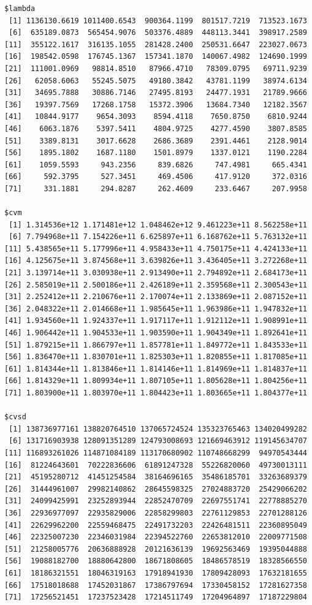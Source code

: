 \documentclass[
]{article}
\begin{document}
\begin{verbatim}
$lambda
 [1] 1136130.6619 1011400.6543  900364.1199  801517.7219  713523.1673
 [6]  635189.0873  565454.9076  503376.4889  448113.3441  398917.2589
[11]  355122.1617  316135.1055  281428.2400  250531.6647  223027.0673
[16]  198542.0598  176745.1367  157341.1870  140067.4982  124690.1999
[21]  111001.0969   98814.8510   87966.4710   78309.0795   69711.9239
[26]   62058.6063   55245.5075   49180.3842   43781.1199   38974.6134
[31]   34695.7888   30886.7146   27495.8193   24477.1931   21789.9666
[36]   19397.7569   17268.1758   15372.3906   13684.7340   12182.3567
[41]   10844.9177    9654.3093    8594.4118    7650.8750    6810.9244
[46]    6063.1876    5397.5411    4804.9725    4277.4590    3807.8585
[51]    3389.8131    3017.6628    2686.3689    2391.4461    2128.9014
[56]    1895.1802    1687.1180    1501.8979    1337.0121    1190.2284
[61]    1059.5593     943.2356     839.6826     747.4981     665.4341
[66]     592.3795     527.3451     469.4506     417.9120     372.0316
[71]     331.1881     294.8287     262.4609     233.6467     207.9958

$cvm
 [1] 1.314536e+12 1.171481e+12 1.048462e+12 9.461223e+11 8.562258e+11
 [6] 7.794968e+11 7.154226e+11 6.625897e+11 6.168762e+11 5.763132e+11
[11] 5.438565e+11 5.177996e+11 4.958433e+11 4.750175e+11 4.424133e+11
[16] 4.125675e+11 3.874568e+11 3.639826e+11 3.436405e+11 3.272268e+11
[21] 3.139714e+11 3.030938e+11 2.913490e+11 2.794892e+11 2.684173e+11
[26] 2.585019e+11 2.500186e+11 2.426189e+11 2.359568e+11 2.300543e+11
[31] 2.252412e+11 2.210676e+11 2.170074e+11 2.133869e+11 2.087152e+11
[36] 2.048322e+11 2.014668e+11 1.985645e+11 1.963986e+11 1.947832e+11
[41] 1.934560e+11 1.924337e+11 1.917117e+11 1.912112e+11 1.908991e+11
[46] 1.906442e+11 1.904533e+11 1.903590e+11 1.904349e+11 1.892641e+11
[51] 1.879215e+11 1.866797e+11 1.857781e+11 1.849772e+11 1.843533e+11
[56] 1.836470e+11 1.830701e+11 1.825303e+11 1.820855e+11 1.817085e+11
[61] 1.814344e+11 1.813846e+11 1.814146e+11 1.814969e+11 1.814837e+11
[66] 1.814329e+11 1.809934e+11 1.807105e+11 1.805628e+11 1.804256e+11
[71] 1.803900e+11 1.803970e+11 1.804423e+11 1.803665e+11 1.804377e+11

$cvsd
 [1] 138736977161 138820764510 137065724524 135323765463 134020499282
 [6] 131716903938 128091351289 124793008693 121669463912 119145634707
[11] 116893261026 114871084189 113170680902 110748668299  94970543444
[16]  81224643601  70222836606  61891247328  55226820060  49730013111
[21]  45195280712  41451254584  38164696165  35486185701  33263689379
[26]  31444961007  29982140862  28645598325  27024883720  25429066202
[31]  24099425991  23252893944  22852470709  22697551741  22778885270
[36]  22936977097  22935829006  22858299803  22761129853  22701288126
[41]  22629962200  22559468475  22491732203  22426481511  22360895049
[46]  22325007230  22346031984  22394522760  22653812010  22009771508
[51]  21258005776  20636888928  20121636139  19692563469  19395044888
[56]  19088182700  18880642800  18671808605  18486578519  18328566550
[61]  18186321551  18046319163  17918941930  17809428093  17632181655
[66]  17518018688  17452031867  17386797694  17330458152  17281627358
[71]  17256521451  17237523428  17214511749  17204964897  17187229804


\end{verbatim}
\end{document}
